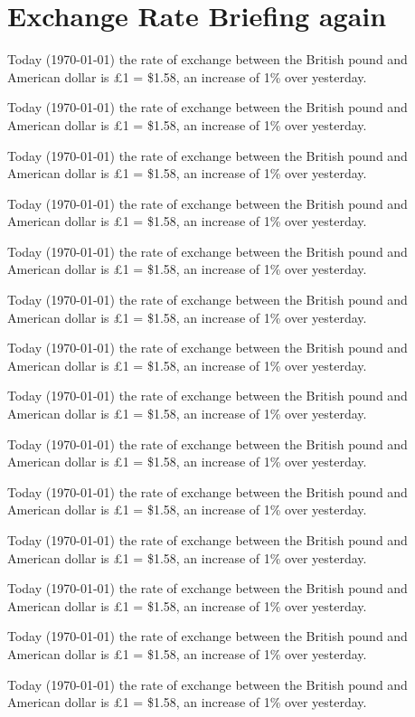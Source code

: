 \documentclass{article}
\begin{document}
\section{Exchange Rate Briefing again}
Today (\today) the rate of exchange between the British
pound and American dollar is \pounds 1 = \$1.58, an
increase of 1\% over yesterday.

Today (\today) the rate of exchange between the British
pound and American dollar is \pounds 1 = \$1.58, an
increase of 1\% over yesterday.

Today (\today) the rate of exchange between the British
pound and American dollar is \pounds 1 = \$1.58, an
increase of 1\% over yesterday.

Today (\today) the rate of exchange between the British
pound and American dollar is \pounds 1 = \$1.58, an
increase of 1\% over yesterday.

Today (\today) the rate of exchange between the British
pound and American dollar is \pounds 1 = \$1.58, an
increase of 1\% over yesterday.

Today (\today) the rate of exchange between the British
pound and American dollar is \pounds 1 = \$1.58, an
increase of 1\% over yesterday.

Today (\today) the rate of exchange between the British
pound and American dollar is \pounds 1 = \$1.58, an
increase of 1\% over yesterday.

Today (\today) the rate of exchange between the British
pound and American dollar is \pounds 1 = \$1.58, an
increase of 1\% over yesterday.

Today (\today) the rate of exchange between the British
pound and American dollar is \pounds 1 = \$1.58, an
increase of 1\% over yesterday.

Today (\today) the rate of exchange between the British
pound and American dollar is \pounds 1 = \$1.58, an
increase of 1\% over yesterday.

Today (\today) the rate of exchange between the British
pound and American dollar is \pounds 1 = \$1.58, an
increase of 1\% over yesterday.

Today (\today) the rate of exchange between the British
pound and American dollar is \pounds 1 = \$1.58, an
increase of 1\% over yesterday.

Today (\today) the rate of exchange between the British
pound and American dollar is \pounds 1 = \$1.58, an
increase of 1\% over yesterday.

Today (\today) the rate of exchange between the British
pound and American dollar is \pounds 1 = \$1.58, an
increase of 1\% over yesterday.
\end{document}
